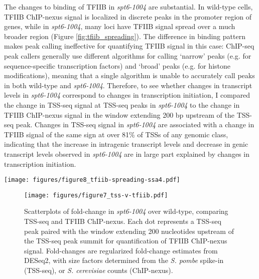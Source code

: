 \documentclass[9pt, letterpaper]{article}
\begin{document}
The changes to binding of TFIIB in \textit{spt6-1004} are substantial. In wild-type cells, TFIIB ChIP-nexus signal is localized in discrete peaks in the promoter region of genes, while in \textit{spt6-1004}, many loci have TFIIB signal spread over a much broader region (Figure \ref{fig:tfiib_spreading}). The difference in binding pattern makes peak calling ineffective for quantifying TFIIB signal in this case: ChIP-seq peak callers generally use different algorithms for calling `narrow' peaks (e.g. for sequence-specific transcription factors) and `broad' peaks (e.g. for histone modifications), meaning that a single algorithm is unable to accurately call peaks in both wild-type and \textit{spt6-1004}. Therefore, to see whether changes in transcript levels in \textit{spt6-1004} correspond to changes in transcription initiation, I compared the change in TSS-seq signal at TSS-seq peaks in \textit{spt6-1004} to the change in TFIIB ChIP-nexus signal in the window extending 200 bp upstream of the TSS-seq peak. Changes in TSS-seq signal in \textit{spt6-1004} are associated with a change in TFIIB signal of the same sign at over 81\% of TSSs of any genomic class, indicating that the increase in intragenic transcript levels and decrease in genic transcript levels observed in \textit{spt6-1004} are in large part explained by changes in transcription initiation.

\begin{SCfigure}[50][h]
\centering
\texttt{[image: figures/figure8\_tfiib-spreading-ssa4.pdf]}
\caption{Top) TFIIB ChIP-nexus protection in wild-type and \textit{spt6-1004} strains over 20 kb of chromosome II flanking the \textit{SSA4} gene. Bottom) Expanded view of TFIIB protection over the \textit{SSA4} gene.}
\label{fig:tfiib_spreading}
\end{SCfigure}

\begin{figure}[h]
\centering
\texttt{[image: figures/figure7\_tss-v-tfiib.pdf]}
\caption{Scatterplots of fold-change in \textit{spt6-1004} over wild-type, comparing TSS-seq and TFIIB ChIP-nexus. Each dot represents a TSS-seq peak paired with the window extending 200 nucleotides upstream of the TSS-seq peak summit for quantification of TFIIB ChIP-nexus signal. Fold-changes are regularized fold-change estimates from DESeq2, with size factors determined from the \textit{S. pombe} spike-in (TSS-seq), or \textit{S. cerevisiae} counts (ChIP-nexus).}
\end{figure}
\end{document}

